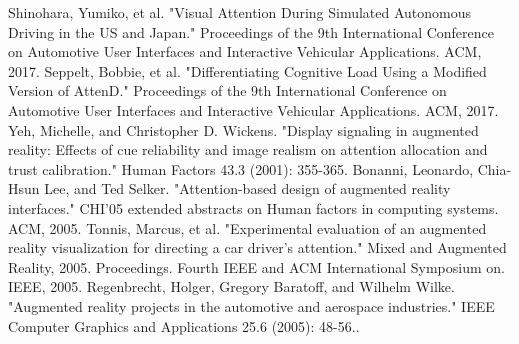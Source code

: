 \documentclass[a4paper, 11pt]{article}
\begin{document}
\begin{thebibliography}{9}
 Shinohara, Yumiko, et al. "Visual Attention During Simulated Autonomous Driving in the US and Japan." Proceedings of the 9th International Conference on Automotive User Interfaces and Interactive Vehicular Applications. ACM, 2017.
 Seppelt, Bobbie, et al. "Differentiating Cognitive Load Using a Modified Version of AttenD." Proceedings of the 9th International Conference on Automotive User Interfaces and Interactive Vehicular Applications. ACM, 2017.
 Yeh, Michelle, and Christopher D. Wickens. "Display signaling in augmented reality: Effects of cue reliability and image realism on attention allocation and trust calibration." Human Factors 43.3 (2001): 355-365.
 Bonanni, Leonardo, Chia-Hsun Lee, and Ted Selker. "Attention-based design of augmented reality interfaces." CHI'05 extended abstracts on Human factors in computing systems. ACM, 2005.
 Tonnis, Marcus, et al. "Experimental evaluation of an augmented reality visualization for directing a car driver's attention." Mixed and Augmented Reality, 2005. Proceedings. Fourth IEEE and ACM International Symposium on. IEEE, 2005.
 Regenbrecht, Holger, Gregory Baratoff, and Wilhelm Wilke. "Augmented reality projects in the automotive and aerospace industries." IEEE Computer Graphics and Applications 25.6 (2005): 48-56..
\end{thebibliography}
\end{document}
